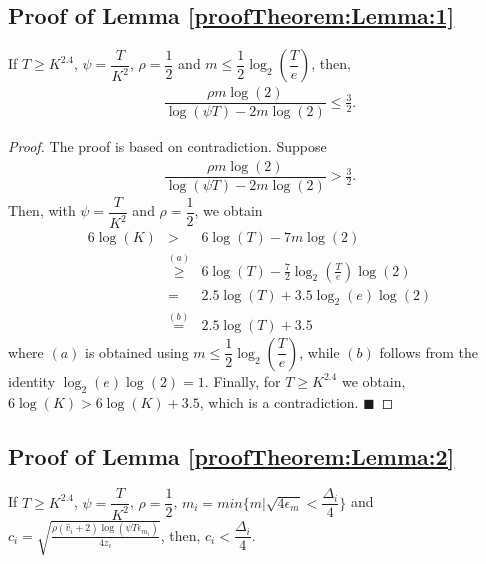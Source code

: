 
\subsection{Proof of Lemma \ref{proofTheorem:Lemma:1}} 

\label{App:Lemma:1}

\begin{customlem}{1}
If $T\geq K^{2.4}$, $\psi=\dfrac{T}{ K^2}$, $\rho=\dfrac{1}{2}$ and $m\leq \dfrac{1}{2} \log_2\left(\dfrac{T}{e}\right) $, then,
\begin{align*}
\dfrac{\rho m \log(2)}{\log(\psi T) - 2m\log( 2)} \leq \frac{3}{2}.
\end{align*}
\end{customlem}

\begin{proof}
The proof is based on contradiction. Suppose
\begin{eqnarray*}
\dfrac{\rho m \log(2)}{\log(\psi T) - 2m\log( 2)} > \frac{3}{2}.
\end{eqnarray*}
Then, with $\psi=\dfrac{T}{ K^2}$ and $\rho=\dfrac{1}{2}$, we obtain
\begin{eqnarray*}
6\log(K) 
&>& 6\log(T) - 7m\log(2) \\
&\overset{(a)}{\ge}& 6\log(T) - \frac{7}{2} \log_2\left(\frac{T}{e}\right) \log(2) \\
&=& 2.5\log(T) + 3.5 \log_2(e)\log(2)  \\
&\overset{(b)}{=}& 2.5\log(T) +3.5
\end{eqnarray*}
where $(a)$ is obtained using $m\leq \dfrac{1}{2} \log_2\left(\dfrac{T}{e}\right)$, while $(b)$ follows from the identity $\log_2(e)\log(2) =1$. Finally, for $T\ge K^{2.4}$ we obtain, $6\log(K)>6\log(K)+3.5$, which is a contradiction.
\hfill $\blacksquare$	
\end{proof}

\subsection{Proof of Lemma \ref{proofTheorem:Lemma:2}}
\label{App:Lemma:2}
\begin{customlem}{2}
If $T\geq K^{2.4}$, $\psi=\dfrac{T}{ K^2}$, $\rho =\dfrac{1}{2}$, $m_i = min\lbrace m|\sqrt{4\epsilon_{m} } < \dfrac{\Delta_i}{4} \rbrace $ and $c_{i} =\sqrt{\frac{\rho (\hat{v}_i + 2)\log (\psi T\epsilon_{m_{i}})}{4 z_i}}$, then, $c_{i} < \dfrac{\Delta_i}{4}$.
\end{customlem}

